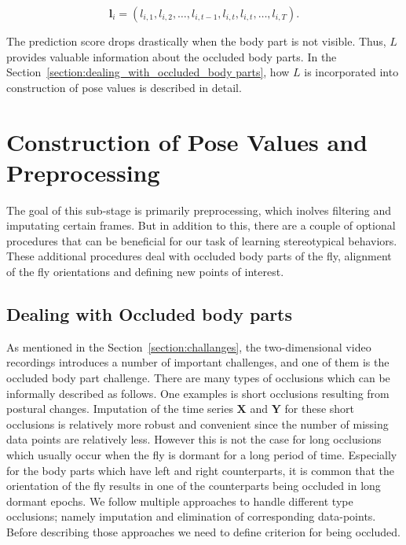\begin{equation*}
	\mathbf{l}_i = (l_{i,1}, l_{i,2}, \dots, l_{i,t-1}, l_{i,t}, l_{i,t}, \dots, l_{i,T}).
\end{equation*}

The prediction score drops drastically when the body part is not visible. Thus, $L$ provides valuable information about the occluded body parts. In the Section~\ref{section:dealing_with_occluded_body parts}, how $L$ is incorporated into construction of pose values is described in detail.

\section{Construction of Pose Values and Preprocessing}
The goal of this sub-stage is primarily preprocessing, which inolves filtering and imputating certain frames.
But in addition to this, there are a couple of optional procedures that can be beneficial for our task of learning stereotypical behaviors.
These additional procedures deal with occluded body parts of the fly, alignment of the fly orientations and defining new points of interest.

\subsection{Dealing with Occluded body parts}\label{section:dealing_with_occluded_body-parts}
As mentioned in the Section~\ref{section:challanges}, the two-dimensional video recordings introduces a number of important challenges, and one of them is the occluded body part challenge.
There are many types of occlusions which can be informally described as follows.
One examples is short occlusions resulting from postural changes.
Imputation of the time series $\mathbf{X}$ and $\mathbf{Y}$ for these short occlusions is relatively more robust and convenient since the number of missing data points are relatively less.
However this is not the case for long occlusions which usually occur when the fly is dormant for a long period of time.
Especially for the body parts which have left and right counterparts, it is common that the orientation of the fly results in one of the counterparts being occluded in long dormant epochs.
We follow multiple approaches to handle different type occlusions; namely imputation and elimination of corresponding data-points.
Before describing those approaches we need to define criterion for being occluded.

